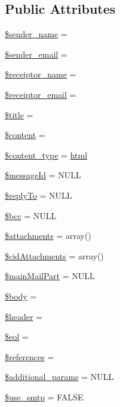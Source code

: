 \subsection*{Public Attributes}
\begin{DoxyCompactItemize}
\item 
\hyperlink{classMail_a0ad6aa18dc8ea8c632bb7a82175e8d68}{\$sender\+\_\+name} = \textquotesingle{}\textquotesingle{}
\item 
\hyperlink{classMail_a94dccbbdc161e818d90e41ad197ebe85}{\$sender\+\_\+email} = \textquotesingle{}\textquotesingle{}
\item 
\hyperlink{classMail_a44df4937f3c8b2691e9bbb1220c667f3}{\$receiptor\+\_\+name} = \textquotesingle{}\textquotesingle{}
\item 
\hyperlink{classMail_aa034785886f8bdcf3a5ed9c86ce8ed14}{\$receiptor\+\_\+email} = \textquotesingle{}\textquotesingle{}
\item 
\hyperlink{classMail_aea1a8697c961d49a688564c5ca16cbcb}{\$title} = \textquotesingle{}\textquotesingle{}
\item 
\hyperlink{classMail_a5a3320973718a2ca8a3fe798bf79c624}{\$content} = \textquotesingle{}\textquotesingle{}
\item 
\hyperlink{classMail_ac933733b17efbb4978a46e557d32c440}{\$content\+\_\+type} = \textquotesingle{}\hyperlink{JSSpec_8js_a28141bc89afb42a8f39e596105992271}{html}\textquotesingle{}
\item 
\hyperlink{classMail_a48caf58883e736f50ab87a03147c584a}{\$message\+Id} = N\+U\+LL
\item 
\hyperlink{classMail_a55788852017ccc1716af69cdde26df99}{\$reply\+To} = N\+U\+LL
\item 
\hyperlink{classMail_a2e25b3c43459422d40765d581b165692}{\$bcc} = N\+U\+LL
\item 
\hyperlink{classMail_a93b05b1003cc8ea16b59c00d77f47466}{\$attachments} = array()
\item 
\hyperlink{classMail_a66c6752b550e4e8fd79a63b62815f48f}{\$cid\+Attachments} = array()
\item 
\hyperlink{classMail_ad58544ae1c34119ec852e3c22b855624}{\$main\+Mail\+Part} = N\+U\+LL
\item 
\hyperlink{classMail_acbd542849121b33a76ed63e1c4670e02}{\$body} = \textquotesingle{}\textquotesingle{}
\item 
\hyperlink{classMail_ace98431d0944d23544743094b443d506}{\$header} = \textquotesingle{}\textquotesingle{}
\item 
\hyperlink{classMail_acaebf19cba0b8be83989e241c96f9eb7}{\$eol} = \textquotesingle{}\textquotesingle{}
\item 
\hyperlink{classMail_abcd438320caac44b166df90ba9092fe9}{\$references} = \textquotesingle{}\textquotesingle{}
\item 
\hyperlink{classMail_a38466de017089677f088c9a4025f724f}{\$additional\+\_\+params} = N\+U\+LL
\item 
\hyperlink{classMail_a8fe39b2063dc112d7db67be074142628}{\$use\+\_\+smtp} = F\+A\+L\+SE
\end{DoxyCompactItemize}



